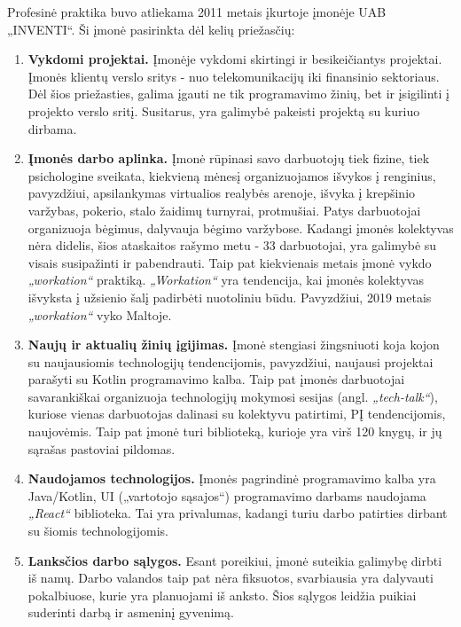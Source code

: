 Profesinė praktika buvo atliekama 2011 metais įkurtoje įmonėje UAB „INVENTI“. Ši įmonė pasirinkta dėl kelių priežasčių:

\begin{enumerate}
    \item \textbf{Vykdomi projektai.} Įmonėje vykdomi skirtingi ir besikeičiantys projektai. Įmonės klientų verslo sritys - nuo telekomunikacijų iki finansinio sektoriaus.
    Dėl šios priežasties, galima įgauti ne tik programavimo žinių, bet ir įsigilinti į projekto verslo sritį. Susitarus, yra galimybė pakeisti projektą su kuriuo dirbama.
    \item \textbf{Įmonės darbo aplinka.} Įmonė rūpinasi savo darbuotojų tiek fizine, tiek psichologine sveikata, kiekvieną mėnesį organizuojamos išvykos į renginius, pavyzdžiui,
    apsilankymas virtualios realybės arenoje, išvyka į krepšinio varžybas, pokerio, stalo žaidimų turnyrai, protmušiai. Patys darbuotojai organizuoja bėgimus, dalyvauja bėgimo
    varžybose. Kadangi įmonės kolektyvas nėra didelis, šios ataskaitos rašymo metu - 33 darbuotojai, yra galimybė su visais susipažinti ir pabendrauti.
    Taip pat kiekvienais metais įmonė vykdo \textit{„workation“} praktiką. \textit{„Workation“} yra tendencija, kai įmonės kolektyvas išvyksta į užsienio šalį padirbėti nuotoliniu būdu.
    Pavyzdžiui, 2019 metais \textit{„workation“} vyko Maltoje.
    \item \textbf{Naujų ir aktualių žinių įgijimas.} Įmonė stengiasi žingsniuoti koja kojon su naujausiomis technologijų tendencijomis, pavyzdžiui, naujausi projektai parašyti su
    Kotlin programavimo kalba. Taip pat įmonės darbuotojai savarankiškai organizuoja technologijų mokymosi sesijas (angl. \textit{„tech-talk“}), kuriose vienas darbuotojas dalinasi su kolektyvu
    patirtimi, PĮ tendencijomis, naujovėmis. Taip pat įmonė turi biblioteką, kurioje yra virš 120 knygų, ir jų sąrašas pastoviai pildomas.
    \item \textbf{Naudojamos technologijos.} Įmonės pagrindinė programavimo kalba yra Java/Kotlin, UI („vartotojo sąsajos“) programavimo darbams naudojama \textit{„React“} biblioteka. Tai yra privalumas,
    kadangi turiu darbo patirties dirbant su šiomis technologijomis.
    \item \textbf{Lanksčios darbo sąlygos.} Esant poreikiui, įmonė suteikia galimybę dirbti iš namų.
    Darbo valandos taip pat nėra fiksuotos, svarbiausia yra dalyvauti pokalbiuose, kurie yra planuojami iš anksto. Šios sąlygos leidžia
    puikiai suderinti darbą ir asmeninį gyvenimą.
\end{enumerate}

